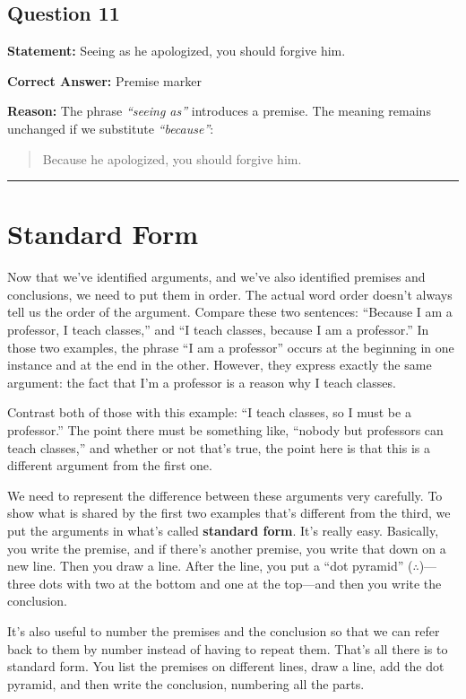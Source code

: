 \documentclass[12pt]{article}
\newcommand{\separator}{\noindent\rule{\linewidth}{1pt}}
\begin{document}
\subsection*{Question 11}
\textbf{Statement:}
Seeing as he apologized, you should forgive him.

\textbf{Correct Answer:} Premise marker

\textbf{Reason:}
The phrase \emph{``seeing as''} introduces a premise. The meaning remains unchanged if we substitute \emph{``because''}:
\begin{quote}
    Because he apologized, you should forgive him.
\end{quote}

\separator

\section{Standard Form}
Now that we've identified arguments, and we've also identified premises and conclusions, we need to put them in order. The actual word order doesn't always tell us the order of the argument. Compare these two sentences: ``Because I am a professor, I teach classes,'' and ``I teach classes, because I am a professor.'' In those two examples, the phrase ``I am a professor'' occurs at the beginning in one instance and at the end in the other. However, they express exactly the same argument: the fact that I'm a professor is a reason why I teach classes.

Contrast both of those with this example: ``I teach classes, so I must be a professor.'' The point there must be something like, ``nobody but professors can teach classes,'' and whether or not that's true, the point here is that this is a different argument from the first one.

We need to represent the difference between these arguments very carefully. To show what is shared by the first two examples that's different from the third, we put the arguments in what's called \textbf{standard form}. It's really easy. Basically, you write the premise, and if there's another premise, you write that down on a new line. Then you draw a line. After the line, you put a ``dot pyramid'' ($\therefore$)—three dots with two at the bottom and one at the top—and then you write the conclusion.

It's also useful to number the premises and the conclusion so that we can refer back to them by number instead of having to repeat them. That's all there is to standard form. You list the premises on different lines, draw a line, add the dot pyramid, and then write the conclusion, numbering all the parts.
\end{document}
